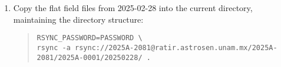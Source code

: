 \begin{enumerate}
\item
Copy the flat field files from 2025-02-28 into the current directory, maintaining the directory structure:
\begin{quote}\footnotesize\begin{verbatim}
RSYNC_PASSWORD=PASSWORD \
rsync -a rsync://2025A-2081@ratir.astrosen.unam.mx/2025A-2081/2025A-0001/20250228/ .
\end{verbatim}
\end{quote}

\end{enumerate}
